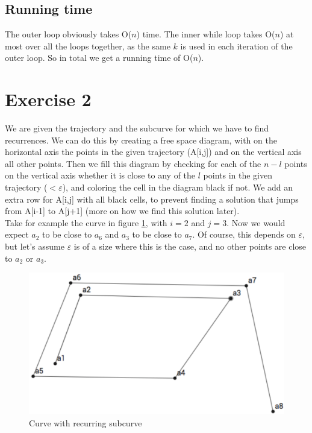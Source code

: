 \documentclass[a4paper,11pt]{article}
\begin{document}
\subsection*{Running time}
The outer loop obviously takes O($n$) time. The inner while loop takes O($n$) at most over all the loops together, as the same $k$ is used in each iteration of the outer loop. So in total we get a running time of O($n$).



\section*{Exercise 2}
We are given the trajectory and the subcurve for which we have to find recurrences. We can do this by creating a free space diagram, with on the horizontal axis the points in the given trajectory (A[i,j]) and on the vertical axis all other points. Then we fill this diagram by checking for each of the $n-l$ points on the vertical axis whether it is close to any of the $l$ points in the given trajectory ($< \varepsilon$), and coloring the cell in the diagram black if not. We add an extra row for A[i,j] with all black cells, to prevent finding a solution that jumps from A[i-1] to A[j+1] (more on how we find this solution later).\\

Take for example the curve in figure \ref{fig:curve1}, with $i = 2$ and $j = 3$. Now we would expect $a_2$ to be close to $a_6$ and $a_3$ to be close to $a_7$. Of course, this depends on $\varepsilon$, but let's assume $\varepsilon$ is of a size where this is the case, and no other points are close to $a_2$ or $a_3$.

\begin{figure}[H]
	\centering
	\includegraphics[scale=0.5]{curve1}
	\caption{Curve with recurring subcurve}
	\label{fig:curve1}
\end{figure}
\end{document}
